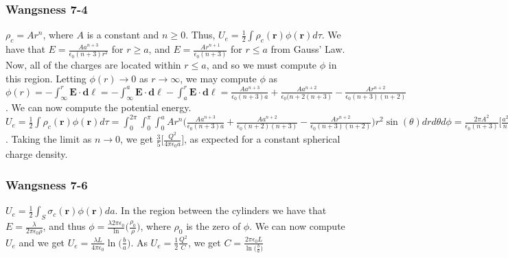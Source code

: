             \subsubsection{Wangsness 7-4}
                $\rho_c = Ar^n$, where $A$ is a constant and $n\geq 0$.
                Thus, $U_e=\frac{1}{2}\int\rho_c(\mathbf{r})\phi(\mathbf{r})d\tau$.
                We have that $E=\frac{Aa^{n+3}}{\epsilon_0 (n+3)r^2}$
                for $r\geq a$, and $E=\frac{Ar^{n+1}}{\epsilon_0(n+3)}$ for
                $r\leq a$ from Gauss' Law. Now, all of the charges are located within
                $r\leq a$, and so we must compute $\phi$ in this region.
                Letting $\phi(r)\rightarrow 0$ as $r\rightarrow \infty$,
                we may compute $\phi$ as
                $\phi(r)=-\int_{\infty}^{r}\mathbf{E}\cdot\mathbf{d\ell}=-\int_{\infty}^{a}\mathbf{E}\cdot\mathbf{d\ell}- \int_{a}^{r}\mathbf{E}\cdot \mathbf{d\ell}= \frac{Aa^{n+3}}{\epsilon_0(n+3)a}+\frac{Aa^{n+2}}{\epsilon_0(n+2(n+3)}-\frac{Ar^{n+2}}{\epsilon_0(n+3)(n+2)}$.
                We can now compute the potential energy.
                $U_e=\frac{1}{2}\int\rho_c(\mathbf{r})\phi(\mathbf{r})d\tau=\int_{0}^{2\pi}\int_{0}^{\pi}\int_{0}^{a}Ar^n \bigg(\frac{Aa^{n+3}}{\epsilon_0(n+3)a}+\frac{Aa^{n+2}}{\epsilon_0(n+2)(n+3)}-\frac{Ar^{n+2}}{\epsilon_0(n+3)(n+2)}\bigg)r^2 \sin(\theta)dr d\theta d\phi = \frac{2\pi A^2}{\epsilon_0 (n+3)}\bigg[\frac{a^{2n+5}}{n+3}+\frac{a^{2n+5}}{(n+2)(n+3)}-\frac{a^{2n+5}}{(n+2)(2n+5)}\bigg]$.
                Taking the limit as $n\rightarrow 0$, we get $\frac{3}{5}\bigg[\frac{Q^2}{4\pi \epsilon_0 a}\bigg]$,
                as expected for a constant spherical charge density.
            \subsubsection{Wangsness 7-6}
                $U_e = \frac{1}{2}\int_{S}\sigma_c(\mathbf{r})\phi(\mathbf{r})da$.
                In the region between the cylinders we have that
                $E=\frac{\lambda}{2\pi\epsilon_0\rho}$, and thus
                $\phi= \frac{\lambda 2\pi \epsilon_0}\ln\big(\frac{\rho_0}{\rho}\big)$,
                where $\rho_0$ is the zero of $\phi$. We can now compute $U_e$
                and we get $U_e = \frac{\lambda L}{4\pi\epsilon_0}\ln\big(\frac{b}{a}\big)$.
                As $U_e = \frac{1}{2}\frac{Q^2}{C}$, we get
                $C=\frac{2\pi \epsilon_0 L}{\ln\big(\frac{b}{a}\big)}$
